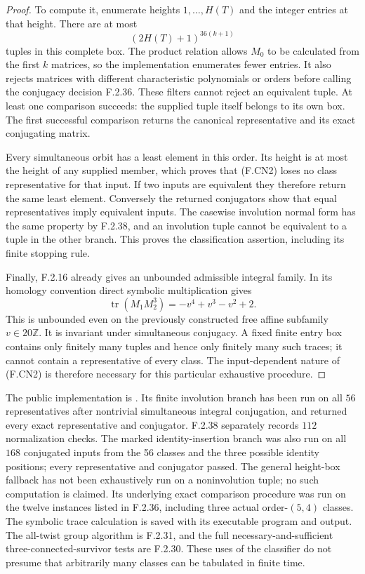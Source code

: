 \begin{proof}
To compute it, enumerate heights $1,\ldots,H(T)$ and the
integer entries at that height. There are at most
\[
                     (2H(T)+1)^{36(k+1)}                  \tag{F.CN2}
\]
tuples in this complete box. The product relation allows
$M_0$ to be calculated from the first $k$ matrices, so the
implementation enumerates fewer entries. It also rejects
matrices with different characteristic polynomials or orders
before calling the conjugacy decision F.2.36. These filters
cannot reject an equivalent tuple. At least one comparison
succeeds: the supplied tuple itself belongs to its own box.
The first successful comparison returns the canonical
representative and its exact conjugating matrix.

Every simultaneous orbit has a least element in this order.
Its height is at most the height of any supplied member,
which proves that (F.CN2) loses no class representative for
that input. If two inputs are equivalent they therefore
return the same least element. Conversely the returned
conjugators show that equal representatives imply equivalent
inputs. The casewise involution normal form has the same
property by F.2.38, and an involution tuple cannot be
equivalent to a tuple in the other branch. This proves the
classification assertion, including its finite stopping rule.

Finally, F.2.16 already gives an unbounded admissible integral
family. In its homology convention direct symbolic
multiplication gives
\[
             \operatorname{tr}(M_1M_2^3)
                       =-v^4+v^3-v^2+2.                 \tag{F.CN3}
\]
This is unbounded even on the previously constructed free
affine subfamily $v\in20\mathbb Z$. It is invariant under
simultaneous conjugacy. A fixed finite entry box contains
only finitely many tuples and hence only finitely many such
traces; it cannot contain a representative of every class.
The input-dependent nature of (F.CN2) is therefore necessary
for this particular exhaustive procedure.
\end{proof}

The public implementation is
.
Its finite involution branch has been run on all $56$
representatives after nontrivial simultaneous integral
conjugation, and returned every exact representative and
conjugator. F.2.38 separately records $112$ normalization
checks. The marked identity-insertion branch was also run
on all $168$ conjugated inputs from the 56 classes and the
three possible identity positions; every representative and
conjugator passed. The general height-box fallback has not been
exhaustively run on a noninvolution tuple; no such computation
is claimed. Its underlying exact comparison procedure was
run on the twelve instances listed in F.2.36, including
three actual order-$(5,4)$ classes. The symbolic trace
calculation is saved with its executable program and output.
The all-twist group algorithm is F.2.31, and the full
necessary-and-sufficient three-connected-survivor tests are
F.2.30. These uses of the classifier do not presume that
arbitrarily many classes can be tabulated in finite time.

